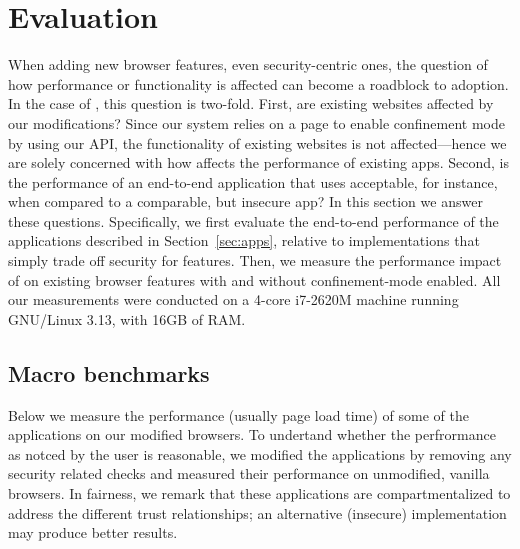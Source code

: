 \section{Evaluation}
\label{sec:eval}

When adding new browser features, even security-centric ones, the
question of how performance or functionality is affected can become a
roadblock to adoption.
%
In the case of \sys{}, this question is two-fold.
%
First, are existing websites affected by our modifications?
%
Since our system relies on a page to enable confinement mode by using
our API, the functionality of existing websites is not
affected---hence we are solely concerned with how \sys{} affects the
performance of existing apps.
%
Second, is the performance of an end-to-end application that uses
\sys{} acceptable, for instance, when compared to a comparable, but
insecure app?
%
In this section we answer these questions.
%
Specifically, we first evaluate the end-to-end performance of the
applications described in Section~\ref{sec:apps}, relative to
implementations that simply trade off security for features.
%
Then, we measure the performance impact of \sys{} on existing browser
features with and without confinement-mode enabled.
%
All our measurements were conducted on a 4-core i7-2620M machine
running GNU/Linux 3.13, with 16GB of RAM.
%


\subsection{Macro benchmarks}
\label{sec:eval:macro}

Below we measure the performance (usually page load time) of some of
the applications on our modified browsers.
%
To undertand whether the perfrormance as notced by the user is
reasonable, we modified the applications by removing any security
related checks and measured their performance on unmodified, vanilla
browsers.
%
In fairness, we remark that these applications are compartmentalized
to address the different trust relationships; an alternative
(insecure) implementation may produce better results.

